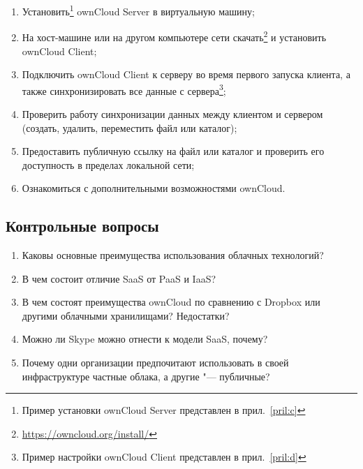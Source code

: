 \begin{enumerate}
    \item Установить\footnote{Пример установки ownCloud Server представлен в прил.~\ref{pril:c}} ownCloud Server в виртуальную машину;
    \item На хост-машине или на другом компьютере сети скачать\footnote{\url{https://owncloud.org/install/}} и установить ownCloud Client;
    \item Подключить ownCloud Client к серверу во время первого запуска клиента, а также синхронизировать все данные с сервера\footnote{Пример настройки ownCloud Client представлен в прил.~\ref{pril:d}};
    \item Проверить работу синхронизации данных между клиентом и сервером (создать, удалить, переместить файл или каталог);
    \item Предоставить публичную ссылку на файл или каталог и проверить его доступность в пределах локальной сети;
    \item Ознакомиться с дополнительными возможностями ownCloud.
\end{enumerate}

\subsection{Контрольные вопросы}
\begin{enumerate}
    \item Каковы основные преимущества использования облачных технологий?
    \item В чем состоит отличие SaaS от PaaS и IaaS?
    \item В чем состоят преимущества ownCloud по сравнению с Dropbox или другими облачными хранилищами? Недостатки?
    \item Можно ли Skype можно отнести к модели SaaS, почему?
    \item Почему одни организации предпочитают использовать в своей инфраструктуре частные облака, а другие "--- публичные?
\end{enumerate}

\clearpage
